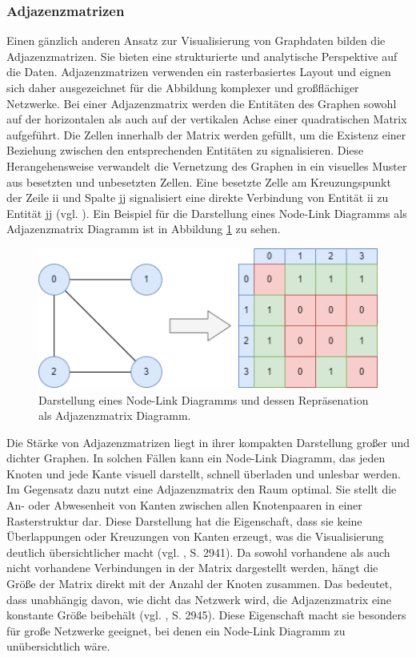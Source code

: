 \subsubsection{Adjazenzmatrizen}

Einen gänzlich anderen Ansatz zur Visualisierung von Graphdaten bilden die Adjazenzmatrizen. Sie bieten eine strukturierte und analytische Perspektive auf die Daten. Adjazenzmatrizen verwenden ein rasterbasiertes Layout und eignen sich daher ausgezeichnet für die Abbildung komplexer und großflächiger Netzwerke. Bei einer Adjazenzmatrix werden die Entitäten des Graphen sowohl auf der horizontalen als auch auf der vertikalen Achse einer quadratischen Matrix aufgeführt. Die Zellen innerhalb der Matrix werden gefüllt, um die Existenz einer Beziehung zwischen den entsprechenden Entitäten zu signalisieren. Diese Herangehensweise verwandelt die Vernetzung des Graphen in ein visuelles Muster aus besetzten und unbesetzten Zellen. Eine besetzte Zelle am Kreuzungspunkt der Zeile ii und Spalte jj signalisiert eine direkte Verbindung von Entität ii zu Entität jj (vgl. \cite{adjacencymatrix:Sauras}). Ein Beispiel für die Darstellung eines Node-Link Diagramms als Adjazenzmatrix Diagramm ist in Abbildung \ref{fig:theory:vistechniques:adjacencymatrix} zu sehen.

\begin{figure}[h]
    \centering
    \includegraphics[height=.3\textwidth]{images/02/NodeLinkToAdjacency.drawio.png}
    \caption{Darstellung eines Node-Link Diagramms und dessen Repräsenation als Adjazenzmatrix Diagramm.}
    \label{fig:theory:vistechniques:adjacencymatrix}
\end{figure}

Die Stärke von Adjazenzmatrizen liegt in ihrer kompakten Darstellung großer und dichter Graphen. In solchen Fällen kann ein Node-Link Diagramm, das jeden Knoten und jede Kante visuell darstellt, schnell überladen und unlesbar werden. Im Gegensatz dazu nutzt eine Adjazenzmatrix den Raum optimal. Sie stellt die An- oder Abwesenheit von Kanten zwischen allen Knotenpaaren in einer Rasterstruktur dar. Diese Darstellung hat die Eigenschaft, dass sie keine Überlappungen oder Kreuzungen von Kanten erzeugt, was die Visualisierung deutlich übersichtlicher macht (vgl. \cite{adjacencyOrNode:Okoe}, S. 2941). Da sowohl vorhandene als auch nicht vorhandene Verbindungen in der Matrix dargestellt werden, hängt die Größe der Matrix direkt mit der Anzahl der Knoten zusammen. Das bedeutet, dass unabhängig davon, wie dicht das Netzwerk wird, die Adjazenzmatrix eine konstante Größe beibehält (vgl. \cite{adjacencyOrNode:Okoe}, S. 2945). Diese Eigenschaft macht sie besonders für große Netzwerke geeignet, bei denen ein Node-Link Diagramm zu unübersichtlich wäre.

